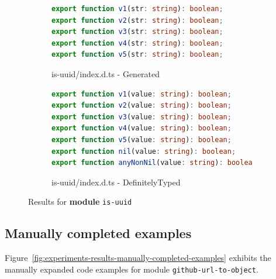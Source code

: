 \documentclass[sigplan,screen]{acmart}
\newcommand{\figref}[1]{Figure~\ref{#1}}
\begin{document}
\begin{figure}[tp]
  \centering
  \begin{subfigure}{0.48\linewidth}
    \begin{lstlisting}[language=TypeScript,numbers=none]
export function v1(str: string): boolean;
export function v2(str: string): boolean;
export function v3(str: string): boolean;
export function v4(str: string): boolean;
export function v5(str: string): boolean;
    \end{lstlisting}
    \caption{is-uuid/index.d.ts - Generated}
  \end{subfigure}
  \hfill
  \begin{subfigure}{0.48\linewidth}
    \begin{lstlisting}[language=TypeScript,numbers=none]
export function v1(value: string): boolean;
export function v2(value: string): boolean;
export function v3(value: string): boolean;
export function v4(value: string): boolean;
export function v5(value: string): boolean;
export function nil(value: string): boolean;
export function anyNonNil(value: string): boolean;
    \end{lstlisting}
    \caption{is-uuid/index.d.ts - DefinitelyTyped}
  \end{subfigure}

  \caption{Results for \textbf{module} \texttt{is-uuid}}
  \label{fig:experiments-results-module-is-uuid}
\end{figure}

\subsection{Manually completed examples}
\label{sec:appendix-manually-completed-examples}
\figref{fig:experiments-results-manually-completed-examples} exhibits the
 manually expanded code examples for module \texttt{github-url-to-object}.
\end{document}
